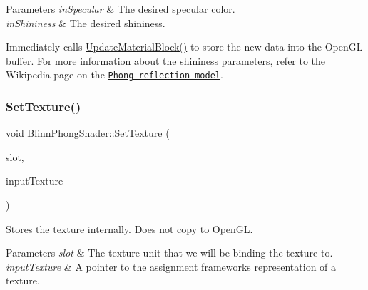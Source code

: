 \begin{DoxyParams}{Parameters}
{\em in\+Specular} & The desired specular color. \\
\hline
{\em in\+Shininess} & The desired shininess.\\
\hline
\end{DoxyParams}
Immediately calls \hyperlink{class_blinn_phong_shader_aa247270120b46431b436220ea6e777be}{Update\+Material\+Block()} to store the new data into the Open\+GL buffer. For more information about the shininess parameters, refer to the Wikipedia page on the \href{https://en.wikipedia.org/wiki/Phong_reflection_model}{\tt Phong reflection model}. \hypertarget{class_blinn_phong_shader_aa9c8908b300ce1451887945fb961d3b2}{}\label{class_blinn_phong_shader_aa9c8908b300ce1451887945fb961d3b2} 
\subsubsection{\texorpdfstring{Set\+Texture()}{SetTexture()}}
{\footnotesize\ttfamily void Blinn\+Phong\+Shader\+::\+Set\+Texture (\begin{DoxyParamCaption}\item[{\hyperlink{struct_blinn_phong_shader_1_1_texture_slots_a98940b49ba855ee47d61a6243c05c34d}{Texture\+Slots\+::\+Type}}]{slot,  }\item[{std\+::shared\+\_\+ptr$<$ class \hyperlink{class_texture}{Texture} $>$}]{input\+Texture }\end{DoxyParamCaption})\hspace{0.3cm}{\ttfamily [virtual]}}



Stores the texture internally. Does not copy to Open\+GL. 


\begin{DoxyParams}{Parameters}
{\em slot} & The texture unit that we will be binding the texture to. \\
\hline
{\em input\+Texture} & A pointer to the assignment framework\textquotesingle{}s representation of a texture. \\
\hline
\end{DoxyParams}
\hypertarget{class_blinn_phong_shader_ab4d435ed4f4815a71590b514550dc2b7}{}\label{class_blinn_phong_shader_ab4d435ed4f4815a71590b514550dc2b7} 
